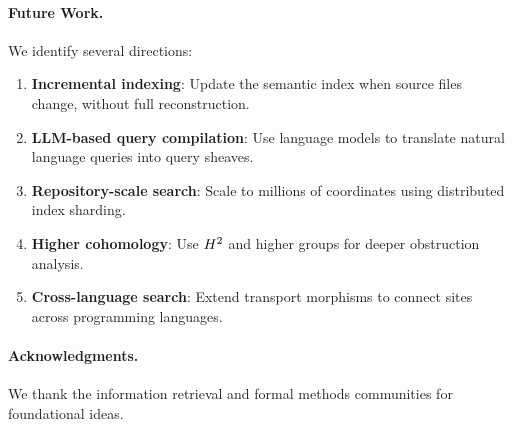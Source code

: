 \documentclass[11pt]{article}
\begin{document}
\paragraph{Future Work.}
We identify several directions:
\begin{enumerate}[noitemsep]
  \item \textbf{Incremental indexing}: Update the semantic index when
        source files change, without full reconstruction.
  \item \textbf{LLM-based query compilation}: Use language models to
        translate natural language queries into query sheaves.
  \item \textbf{Repository-scale search}: Scale to millions of
        coordinates using distributed index sharding.
  \item \textbf{Higher cohomology}: Use $H^{2}$ and higher groups
        for deeper obstruction analysis.
  \item \textbf{Cross-language search}: Extend transport morphisms to
        connect sites across programming languages.
\end{enumerate}

\paragraph{Acknowledgments.}
We thank the information retrieval and formal methods communities for
foundational ideas.
\end{document}
